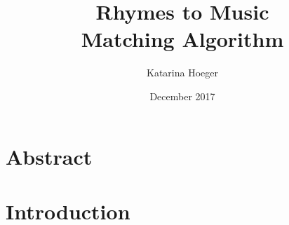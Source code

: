 \documentclass[11pt, oneside, notitlepage, openany]{report}
\title{
	{Rhymes to Music}\\
	{\large Matching Algorithm}\\
}
\author{Katarina Hoeger}
\date{December 2017}
\begin{document}


\maketitle



\newcommand{\webtext}[1]{{\color{blue}\underline{#1}}}

\newcommand{\titletext}[1]{
\noindent \underline{{\large #1}}\\
}

\newcommand{\titletexttwo}[1]{
\vspace*{-.3cm}
\noindent \underline{{\large #1}}\\
\vspace*{-.8cm}
}

\newcommand{\subtitletext}[1]{{\raggedright \textsc{#1}}\\}

\newcommand{\dividingline}{
\vspace{-1cm} {\center \hrulefill}}

\newcommand{\spacing}{\vspace*{-0.8cm}}

\newcommand{\headerspacing}{\vspace*{0.4cm}}

\newcommand{\sectionspacing}{\vspace*{-0.4cm}}

\newcommand{\underlinespacing}{\vspace*{0.1cm}}

\newcommand{\tinyspacing}{\vspace*{-0.1cm}}

\chapter{Abstract}
\chapter{Introduction}

\end{document}
